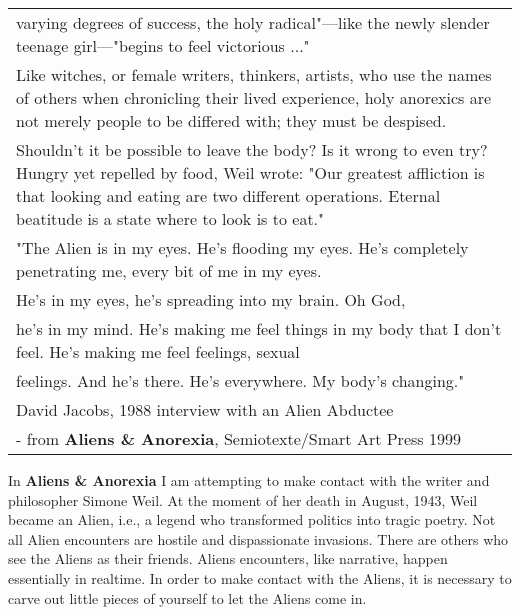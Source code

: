 \begin{longtable}[]{@{}l@{}}
\begin{minipage}[t]{0.97\columnwidth}
varying degrees of success, the holy radical"---like the newly slender
teenage girl---"begins to feel victorious ..."\strut
\end{minipage}\tabularnewline
\begin{minipage}[t]{0.97\columnwidth}\raggedright
Like witches, or female writers, thinkers, artists, who use the names of
others when chronicling their lived experience, holy anorexics are not
merely people to be differed with; they must be despised.\strut
\end{minipage}\tabularnewline
\begin{minipage}[t]{0.97\columnwidth}\raggedright
Shouldn't it be possible to leave the body? Is it wrong to even try?
Hungry yet repelled by food, Weil wrote: "Our greatest affliction is
that looking and eating are two different operations. Eternal beatitude
is a state where to look is to eat."\strut
\end{minipage}\tabularnewline
\begin{minipage}[t]{0.97\columnwidth}\raggedright
"The Alien is in my eyes. He's flooding my eyes. He's completely
penetrating me, every bit of me in my eyes.\strut
\end{minipage}\tabularnewline
\begin{minipage}[t]{0.97\columnwidth}\raggedright
He's in my eyes, he's spreading into my brain. Oh God,\strut
\end{minipage}\tabularnewline
\begin{minipage}[t]{0.97\columnwidth}\raggedright
he's in my mind. He's making me feel things in my body that I don't
feel. He's making me feel feelings, sexual\strut
\end{minipage}\tabularnewline
\begin{minipage}[t]{0.97\columnwidth}\raggedright
feelings. And he's there. He's everywhere. My body's changing."\strut
\end{minipage}\tabularnewline
\begin{minipage}[t]{0.97\columnwidth}\raggedright
David Jacobs, 1988 interview with an Alien Abductee\strut
\end{minipage}\tabularnewline
\begin{minipage}[t]{0.97\columnwidth}\raggedright
- from \textbf{Aliens \& Anorexia}, Semiotexte/Smart Art Press
1999\strut
\end{minipage}\tabularnewline
\bottomrule
\end{longtable}

In \textbf{Aliens \& Anorexia} I am attempting to make contact with the
writer and philosopher Simone Weil. At the moment of her death in
August, 1943, Weil became an Alien, i.e., a legend who transformed
politics into tragic poetry. Not all Alien encounters are hostile and
dispassionate invasions. There are others who see the Aliens as their
friends. Aliens encounters, like narrative, happen essentially in
realtime. In order to make contact with the Aliens, it is necessary to
carve out little pieces of yourself to let the Aliens come in.

